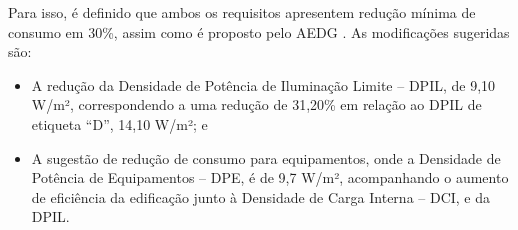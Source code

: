 Para isso, é definido que ambos os requisitos apresentem redução mínima de consumo em 30\%, 
assim como é proposto pelo AEDG \cite{InstitutoNacionaldeMetrologiaNormalizacaoeQualidadeIndustrial-INMETRO2016}. 
As modificações sugeridas são:
    \begin{itemize}
        \item A redução da Densidade de Potência de Iluminação Limite – DPIL, de 9,10 W/m², 
        correspondendo a uma redução de 31,20\% em relação ao DPIL de etiqueta “D”, 14,10 W/m²; e
        \item A sugestão de redução de consumo para equipamentos, onde a Densidade de 
        Potência de Equipamentos – DPE, é de 9,7 W/m², acompanhando o aumento de eficiência 
        da edificação junto à Densidade de Carga Interna – DCI, e da DPIL.
    \end{itemize}
